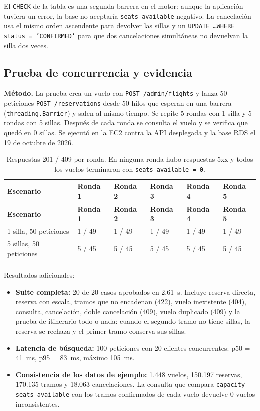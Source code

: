 El \texttt{CHECK} de la tabla es una segunda barrera en el motor: aunque la aplicación tuviera un error, la base no aceptaría \texttt{seats\_available} negativo. La cancelación usa el mismo orden ascendente para devolver las sillas y un \texttt{UPDATE \ldots WHERE status = 'CONFIRMED'} para que dos cancelaciones simultáneas no devuelvan la silla dos veces.

\subsection{Prueba de concurrencia y evidencia}
\textbf{Método.} La prueba crea un vuelo con \texttt{POST /admin/flights} y lanza 50 peticiones \texttt{POST /reservations} desde 50 hilos que esperan en una barrera (\texttt{threading.Barrier}) y salen al mismo tiempo. Se repite 5 rondas con 1 silla y 5 rondas con 5 sillas. Después de cada ronda se consulta el vuelo y se verifica que quedó en 0 sillas. Se ejecutó en la EC2 contra la API desplegada y la base RDS el 19 de octubre de 2026.

\begin{longtable}{@{}L{3.6cm} C{1.9cm} C{1.9cm} C{1.9cm} C{1.9cm} C{1.9cm}@{}}
\toprule \textbf{Escenario} & \textbf{Ronda 1} & \textbf{Ronda 2} & \textbf{Ronda 3} & \textbf{Ronda 4} & \textbf{Ronda 5} \\ \midrule \endfirsthead
\toprule \textbf{Escenario} & \textbf{Ronda 1} & \textbf{Ronda 2} & \textbf{Ronda 3} & \textbf{Ronda 4} & \textbf{Ronda 5} \\ \midrule {} silla, 50 peticiones & 1 / 49 & 1 / 49 & 1 / 49 & 1 / 49 & 1 / 49 \\
5 sillas, 50 peticiones & 5 / 45 & 5 / 45 & 5 / 45 & 5 / 45 & 5 / 45 \\
\bottomrule
\caption{Respuestas 201 / 409 por ronda. En ninguna ronda hubo respuestas 5xx y todos los vuelos terminaron con \texttt{seats\_available = 0}.}
\end{longtable}

Resultados adicionales:
\begin{itemize}
  \item \textbf{Suite completa:} 20 de 20 casos aprobados en 2,61~s. Incluye reserva directa, reserva con escala, tramos que no encadenan (422), vuelo inexistente (404), consulta, cancelación, doble cancelación (409), vuelo duplicado (409) y la prueba de itinerario todo o nada: cuando el segundo tramo no tiene sillas, la reserva se rechaza y el primer tramo conserva sus sillas.
  \item \textbf{Latencia de búsqueda:} 100 peticiones con 20 clientes concurrentes: p50 = 41~ms, p95 = 83~ms, máximo 105~ms.
  \item \textbf{Consistencia de los datos de ejemplo:} 1.448 vuelos, 150.197 reservas, 170.135 tramos y 18.063 cancelaciones. La consulta que compara \texttt{capacity - seats\_available} con los tramos confirmados de cada vuelo devuelve 0 vuelos inconsistentes.
\end{itemize}

